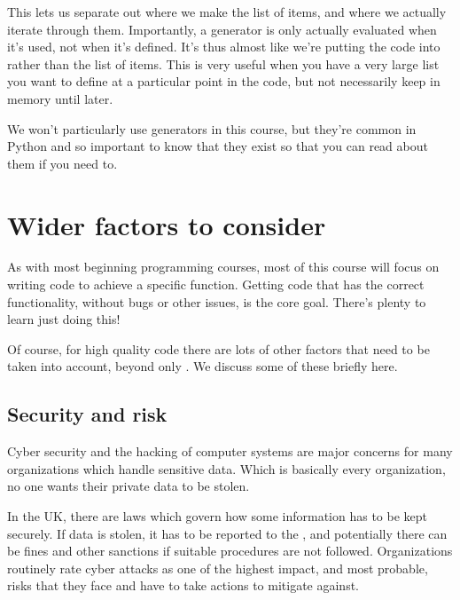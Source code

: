 \documentclass[letterpaper,10pt,british]{sphinxmanual}
\begin{document}
\sphinxAtStartPar
This lets us separate out where we make the list of items, and where we actually iterate through them. Importantly, a generator is only actually evaluated when it’s used, not when it’s defined. It’s thus almost like we’re putting the code into  rather than the list of items. This is very useful when you have a very large list you want to define at a particular point in the code, but not necessarily keep in memory until later.

\sphinxAtStartPar
We won’t particularly use generators in this course, but they’re common in Python and so important to know that they exist so that you can read about them if you need to.

\sphinxstepscope


\chapter{Wider factors to consider}
\label{\detokenize{chapters/wider_factors:wider-factors-to-consider}}\label{\detokenize{chapters/wider_factors::doc}}
\sphinxAtStartPar
As with most beginning programming courses, most of this course will focus on writing code to achieve a specific function. Getting code that has the correct functionality, without bugs or other issues, is the core goal. There’s plenty to learn just doing this!

\sphinxAtStartPar
Of course, for high quality code there are lots of other factors that need to be taken into account, beyond only . We discuss some of these briefly here.


\section{Security and risk}
\label{\detokenize{chapters/wider_factors:security-and-risk}}
\sphinxAtStartPar
Cyber security and the hacking of computer systems are major concerns for many organizations which handle sensitive data. Which is basically every organization, no one wants their private data to be stolen.

\sphinxAtStartPar
In the UK, there are laws which govern how some information has to be kept securely. If data is stolen, it has to be reported to the , and potentially there can be fines and other sanctions if suitable procedures are not followed. Organizations routinely rate cyber attacks as one of the highest impact, and most probable, risks that they face and have to take actions to mitigate against.
\end{document}
